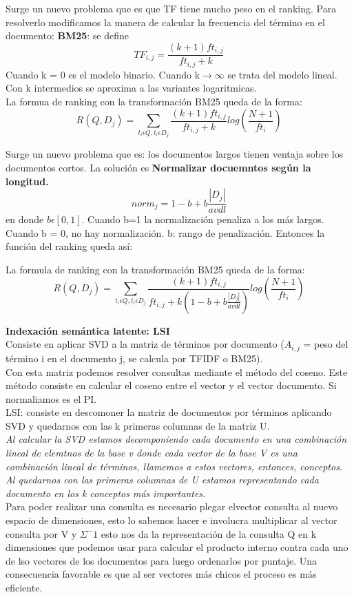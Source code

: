 \documentclass[titlepage,a4paper]{article}
\begin{document}
Surge un nuevo problema que es que TF tiene mucho peso en el ranking. Para resolverlo modificamos la manera de calcular la frecuencia del término en el documento:  \textbf{BM25}: se define $$TF_{i,j} = \frac{(k+1)ft_{i,j}}{ft_{i,j}+k} $$ Cuando k = 0 es el modelo binario. Cuando k$\rightarrow \infty$ se trata del modelo lineal. Con k intermedios se aproxima a las variantes logaritmicas. \\

La formua de ranking con la transformación BM25 queda de la forma: $$R(Q, D_j) = \sum_{t_i \epsilon Q, t_i \epsilon D_j}  \frac{(k+1)ft_{i,j}}{ft_{i,j}+k}log( \frac{N+1}{ft_i}) $$

Surge un nuevo problema que es: los documentos largos tienen ventaja sobre los documentos cortos. La solución es \textbf{Normalizar docuemntos según la longitud.}  $$norm_j = 1-b+b\frac{|D_j|}{avdl} $$ en donde $b\epsilon [0,1]$. Cuando b=1 la normalización penaliza a los más largos. Cuando b = 0, no hay normalización. b: rango de penalización. Entonces la función del ranking queda así: 

La formula de ranking con la transformación BM25 queda de la forma: $$R(Q, D_j) = \sum_{t_i \epsilon Q, t_i \epsilon D_j}  \frac{(k+1)ft_{i,j}}{ft_{i,j}+k (1-b+b\frac{|D_j|}{avdl})}log( \frac{N+1}{ft_i}) $$

\textbf{Indexación semántica latente: LSI}\\

Consiste en aplicar SVD a la matriz de términos por documento ($A_{i,j}$ = peso del término i en el documento j, se calcula por TFIDF o BM25). \\

Con esta matriz podemos resolver consultas mediante el método del coseno. Este método consiste en  calcular el coseno entre el vector  y el vector documento. Si normaliamos es el PI.\\

LSI: consiste en descomoner la matriz de documentos por términos aplicando SVD y quedarnos con las k primeras columnas de la matriz U. \\

\textit{Al calcular la SVD estamos decomponiendo cada documento en una combinación lineal de elemtnos de la base v donde cada vector de la base V es una combinación lineal de términos, llamemos a estos vectores, entonces, conceptos. Al quedarnos con las primeras columnas de U estamos representando cada documento en los k conceptos más importantes. }\\

Para poder realizar una consulta es necesario plegar elvector consulta al nuevo espacio de dimensiones, esto lo sabemos hacer e involucra multiplicar al vector consulta por V y $\Sigma^-1$ esto nos da la representación de la consulta Q en k dimensiones que podemos usar para calcular el producto interno contra cada uno de lso vectores de los documentos para luego ordenarlos por puntaje. Una consecuencia favorable es que al ser vectores más chicos el proceso es más eficiente. 
\end{document}
